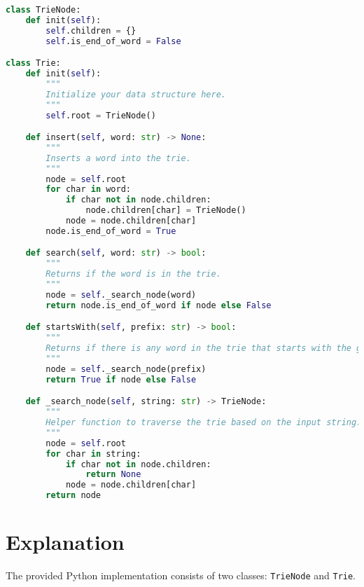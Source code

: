 \begin{fullwidth}
\begin{lstlisting}[language=Python]
class TrieNode:
    def init(self):
        self.children = {}
        self.is_end_of_word = False

class Trie:
    def init(self):
        """
        Initialize your data structure here.
        """
        self.root = TrieNode()

    def insert(self, word: str) -> None:
        """
        Inserts a word into the trie.
        """
        node = self.root
        for char in word:
            if char not in node.children:
                node.children[char] = TrieNode()
            node = node.children[char]
        node.is_end_of_word = True

    def search(self, word: str) -> bool:
        """
        Returns if the word is in the trie.
        """
        node = self._search_node(word)
        return node.is_end_of_word if node else False

    def startsWith(self, prefix: str) -> bool:
        """
        Returns if there is any word in the trie that starts with the given prefix.
        """
        node = self._search_node(prefix)
        return True if node else False

    def _search_node(self, string: str) -> TrieNode:
        """
        Helper function to traverse the trie based on the input string.
        """
        node = self.root
        for char in string:
            if char not in node.children:
                return None
            node = node.children[char]
        return node
\end{lstlisting}
\end{fullwidth}

\section*{Explanation}

The provided Python implementation consists of two classes: \texttt{TrieNode} and \texttt{Trie}.

